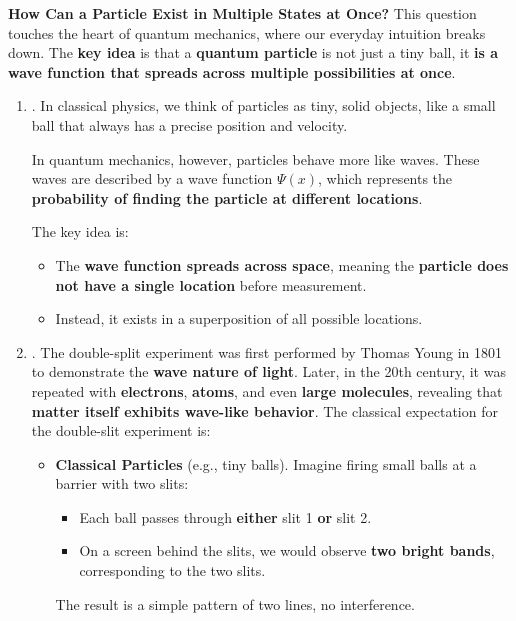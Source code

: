 \noindent
\textcolor{Green3}{ \textbf{How Can a Particle Exist in Multiple States at Once?}} This question touches the heart of quantum mechanics, where our everyday intuition breaks down. The \textbf{key idea} is that a \textbf{quantum particle} is not just a tiny ball, it \textbf{is a wave function that spreads across multiple possibilities at once}.
\begin{enumerate}
    \item {}. In classical physics, we think of particles as tiny, solid objects, like a small ball that always has a precise position and velocity.
    
    In quantum mechanics, however, particles behave more like waves. These waves are described by a wave function $\Psi(x)$, which represents the \textbf{probability of finding the particle at different locations}.
    
    The key idea is:
    \begin{itemize}
        \item The \textbf{wave function spreads across space}, meaning the \textbf{particle does not have a single location} before measurement.
        \item Instead, it exists in a superposition of all possible locations.
    \end{itemize}


    \item {}. The double-split experiment was first performed by Thomas Young in 1801 to demonstrate the \textbf{wave nature of light}. Later, in the 20th century, it was repeated with \textbf{electrons}, \textbf{atoms}, and even \textbf{large molecules}, revealing that \textbf{matter itself exhibits wave-like behavior}. The classical expectation for the double-slit experiment is:
    \begin{itemize}
        \item \textbf{Classical Particles} (e.g., tiny balls). Imagine firing small balls at a barrier with two slits:
        \begin{itemize}
            \item Each ball passes through \textbf{either} slit 1 \textbf{or} slit 2.
            \item On a screen behind the slits, we would observe \textbf{two bright bands}, corresponding to the two slits.
        \end{itemize}
        The result is a simple pattern of two lines, no interference.


\end{itemize}
\end{enumerate}
